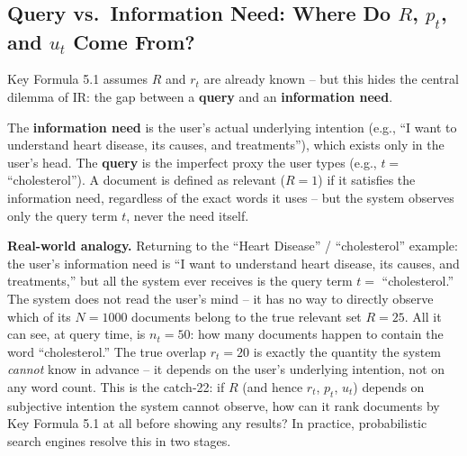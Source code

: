 \documentclass[11pt, a4paper]{article}
\begin{document}
\subsection{Query vs.\ Information Need: Where Do $R$, $p_t$, and $u_t$ Come From?}

Key Formula 5.1 assumes $R$ and $r_t$ are already known -- but this hides the central dilemma of IR: the gap between a \textbf{query} and an \textbf{information need}.

\begin{defbox}
The \textbf{information need} is the user's actual underlying intention (e.g., ``I want to understand heart disease, its causes, and treatments''), which exists only in the user's head. The \textbf{query} is the imperfect proxy the user types (e.g., $t=$ ``cholesterol''). A document is defined as relevant ($R=1$) if it satisfies the information need, regardless of the exact words it uses -- but the system observes only the query term $t$, never the need itself.
\end{defbox}

\textbf{Real-world analogy.} Returning to the ``Heart Disease'' / ``cholesterol'' example: the user's information need is ``I want to understand heart disease, its causes, and treatments,'' but all the system ever receives is the query term $t=$ ``cholesterol.'' The system does not read the user's mind -- it has no way to directly observe which of its $N=1000$ documents belong to the true relevant set $R=25$. All it can see, at query time, is $n_t=50$: how many documents happen to contain the word ``cholesterol.'' The true overlap $r_t=20$ is exactly the quantity the system \emph{cannot} know in advance -- it depends on the user's underlying intention, not on any word count. This is the catch-22: if $R$ (and hence $r_t$, $p_t$, $u_t$) depends on subjective intention the system cannot observe, how can it rank documents by Key Formula 5.1 at all before showing any results? In practice, probabilistic search engines resolve this in two stages.
\end{document}
